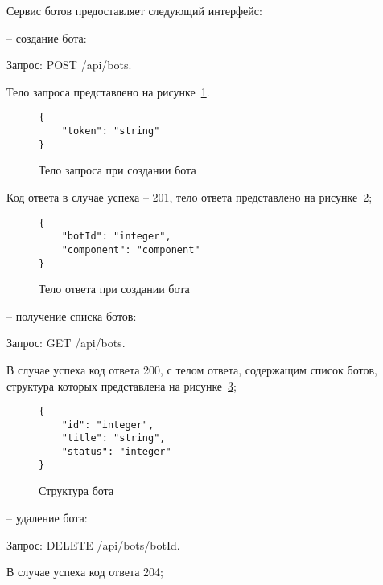 Сервис ботов предоставляет следующий интерфейс:

-- \hspace{\clabelsep} создание бота:

Запрос: POST /api/bots.

Тело запроса представлено на рисунке~\ref{f:add-bot-request-body}.

\begin{figure}[ht]
	\centering
	\vspace{\toppaddingoffigure}
	\begin{lstlisting}
{
    "token": "string"
}
    \end{lstlisting}
	\caption{Тело запроса при создании бота}
	\label{f:add-bot-request-body}
\end{figure}

Код ответа в случае успеха – 201, тело ответа представлено на
рисунке~\ref{f:add-bot-response-body};

\begin{figure}[ht]
	\centering
	\vspace{\toppaddingoffigure}
	\begin{lstlisting}
{
    "botId": "integer",
    "component": "component"
}
    \end{lstlisting}
	\caption{Тело ответа при создании бота}
	\label{f:add-bot-response-body}
\end{figure}

-- \hspace{\clabelsep} получение списка ботов:

Запрос: GET /api/bots.

В случае успеха код ответа 200, с телом ответа, содержащим список
ботов, структура которых представлена
на рисунке~\ref{f:get-bot-response-body};


\begin{figure}[ht]
	\centering
	\vspace{\toppaddingoffigure}
	\begin{lstlisting}
{
    "id": "integer",
    "title": "string",
    "status": "integer"
}
    \end{lstlisting}
	\caption{Структура бота}
	\label{f:get-bot-response-body}
\end{figure}

-- \hspace{\clabelsep} удаление бота:

Запрос: DELETE /api/bots/{botId}.

В случае успеха код ответа 204;

